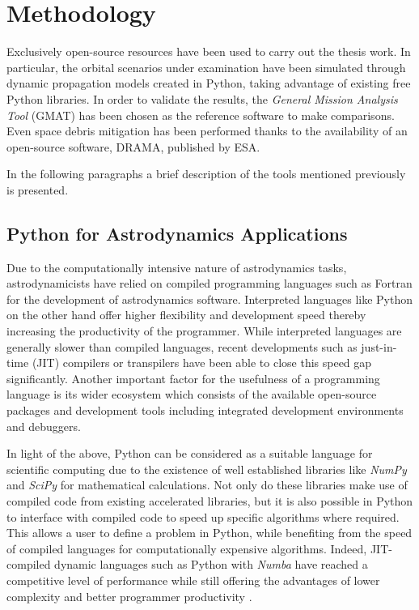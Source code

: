 \chapter{Methodology}

Exclusively open-source resources have been used to carry out the thesis work. 
In particular, the orbital scenarios under examination have been simulated through dynamic propagation models created in Python, taking advantage of existing free Python libraries.   
In order to validate the results, the \textit{General Mission Analysis Tool} (GMAT) has been chosen as the reference software to make comparisons.
Even space debris mitigation has been performed thanks to the availability of an open-source software, DRAMA, published by ESA.

In the following paragraphs a brief description of the tools mentioned previously is presented.

\section{Python for Astrodynamics Applications}

Due to the computationally intensive nature of astrodynamics tasks, astrodynamicists have relied on compiled programming languages such as Fortran for the development of astrodynamics software.
Interpreted languages like Python on the other hand offer higher flexibility and development speed thereby increasing the productivity of the programmer.
While interpreted languages are generally slower than compiled languages, recent developments such as just-in-time (JIT) compilers or transpilers have been able to close this speed gap significantly. 
Another important factor for the usefulness of a programming language is its wider ecosystem which consists of the available open-source packages and development tools including integrated development environments and debuggers. 

In light of the above, Python can be considered as a suitable language for scientific computing due to the existence of well established libraries like \textit{NumPy} and \textit{SciPy} for mathematical calculations.
Not only do these libraries make use of compiled code from existing accelerated libraries, but it is also possible in Python to interface with compiled code to speed up specific algorithms where required.
This allows a user to define a problem in Python, while benefiting from the speed of compiled languages for computationally expensive algorithms.
Indeed, JIT-compiled dynamic languages such as Python with \textit{Numba} have reached a competitive level of performance while still offering the advantages of lower complexity and better programmer productivity
\cite{eichhorn2018comparative}.

